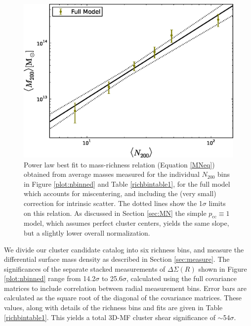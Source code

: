 \begin{figure}
\begin{center}
  \includegraphics[scale=0.7]{plots_ch4/MassRich_shear_FullModelOnly_DuttonMaccio_IntrinsicScatter.eps}
  \caption[Mass-Richness Relation from Shear]{Power law best fit to mass-richness relation (Equation \ref{MNeq}) obtained from average masses measured for the individual $N_{200}$ bins in Figure \ref{plot:nbinned} and Table \ref{richbintable1}, for the full model which accounts for miscentering, and including the (very small) correction for intrinsic scatter. The dotted lines show the 1$\sigma$ limits on this relation. As discussed in Section \ref{sec:MN} the simple $p_{\mathrm{cc}} \equiv 1$ model, which assumes perfect cluster centers, yields the same slope, but a slightly lower overall normalization.}
\label{plot:massrich}
\end{center}
\end{figure}


We divide our cluster candidate catalog into six richness bins, and measure the differential surface mass density as described in Section \ref{sec:measure}. The significances of the separate stacked measurements of $\Delta\Sigma(R)$ shown in Figure \ref{plot:nbinned} range from 14.2$\sigma$ to 25.6$\sigma$, calculated using the full covariance matrices to include correlation between radial measurement bins. Error bars are calculated as the square root of the diagonal of the covariance matrices. These values, along with details of the richness bins and fits are given in Table \ref{richbintable1}. This yields a total \ac{3D-MF} cluster shear significance of $\sim$54$\sigma$. 

